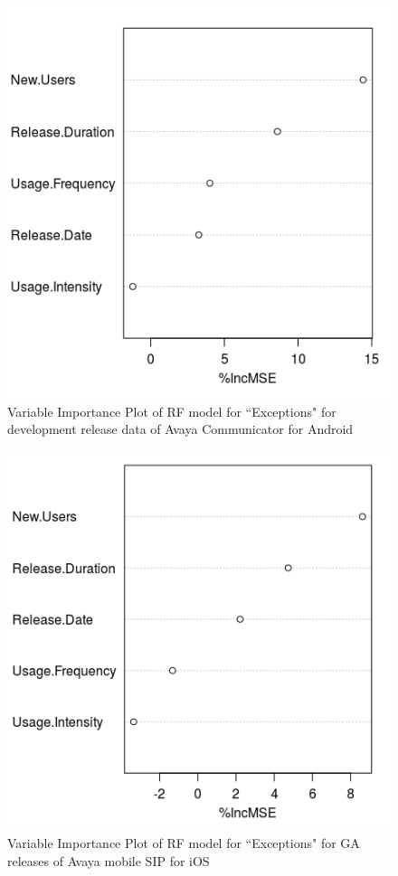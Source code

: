\documentclass[smallextended]{svjour3}       %
\begin{document}
\begin{figure}[!t]
\begin{minipage}{.45\textwidth}
\includegraphics[width=\linewidth]{rfAD}%
\caption{Variable Importance Plot of RF model for ``Exceptions" for development release data of Avaya Communicator for Android}
\label{fig:rfAD}
\end{minipage}
\end{figure}


\begin{figure}[!t]
\centering
\includegraphics[width=0.4\linewidth]{rfI}%
\caption{Variable Importance Plot of RF model for ``Exceptions" for GA releases of Avaya mobile SIP for iOS}
\label{fig:rfI}
\vspace{-10pt}
\end{figure}
\end{document}
